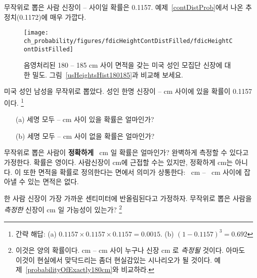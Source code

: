 무작위로 뽑은 사람 신장이  --  사이일 확률은 0.1157. 예제~\ref{contDistProb}에서 나온 추정치(0.1172)에 매우 가깝다.

\begin{figure}
\centering
\texttt{[image: ch\_probability/figures/fdicHeightContDistFilled/fdicHeightContDistFilled]}
\caption{음영처리된 180 -- 185 cm 사이 면적을 갖는 미국 성인 모집단 신장에 대한 밀도. 그림~\ref{usHeightsHist180185}과 비교해 보세요.}
\label{fdicHeightContDistFilled}
\end{figure}

\begin{exercise}
미국 성인 남성을 무작위로 뽑았다. 성인 한명 신장이  --  cm 사이에 있을 확률이 0.1157 이다. 
\footnote{간략 해답: (a) $0.1157 \times 0.1157 \times 0.1157 = 0.0015$. (b) $(1-0.1157)^3 = 0.692$} \vspace{-1.5mm}
\begin{enumerate}
\setlength{\itemsep}{0mm}
\item[(a)] 세명 모두  --  cm 사이 있을 확률은 얼마인가?
\item[(b)] 세명 모두  --  cm 사이 없을 확률은 얼마인가?
\end{enumerate}
\end{exercise}

\begin{example}{무작위로 뽑은 사람이 \textbf{정확하게} ~cm 일 확률은 얼마인가? 완벽하게 측정할 수 있다고 가정한다.}
\label{probabilityOfExactly180cm}
확률은 영이다. 사람신장이  cm에 근접할 수는 있지만, 정확하게  cm는 아니다. 이 또한 면적을 확률로 정의한다는 면에서 의미가 상통한다: ~cm -- ~cm 사이에 잡아낼 수 있는 면적은 없다.
\end{example}

\begin{exercise}
한 사람 신장이 가장 가까운 센티미터에 반올림된다고 가정하자. 무작위로 뽑은 사람을 \emph{측정한} 신장이  cm 일 가능성이 있는가?
\footnote{이것은 양의 확률이다.  cm --  cm 사이 누구나 신장  cm 로 \emph{측정될} 것이다. 아마도 이것이 현실에서 맞닥드리는 좀더 현실감있는 시나리오가 될 것이다. 예제~\ref{probabilityOfExactly180cm}와 비교하라.}
\end{exercise}





